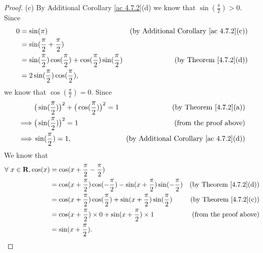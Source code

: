\begin{proof}{(c)}
    By Additional Corollary \ref{ac 4.7.2}(d) we know that \(\sin(\frac{\pi}{2}) > 0\).
    Since
    \begin{align*}
        0 & = \sin(\pi)                                                                         & \text{(by Additional Corollary \ref{ac 4.7.2}(c))} \\
          & = \sin(\frac{\pi}{2} + \frac{\pi}{2})                                                                                                    \\
          & = \sin(\frac{\pi}{2}) \cos(\frac{\pi}{2}) + \cos(\frac{\pi}{2}) \sin(\frac{\pi}{2}) & \text{(by Theorem \ref{4.7.2}(d))}                 \\
          & = 2 \sin(\frac{\pi}{2}) \cos(\frac{\pi}{2}),
    \end{align*}
    we know that \(\cos(\frac{\pi}{2}) = 0\).
    Since
    \begin{align*}
                 & \big(\sin(\frac{\pi}{2})\big)^2 + \big(\cos(\frac{\pi}{2})\big)^2 = 1 & \text{(by Theorem \ref{4.7.2}(a))}                 \\
        \implies & \big(\sin(\frac{\pi}{2})\big)^2 = 1                                   & \text{(from the proof above)}                      \\
        \implies & \sin(\frac{\pi}{2}) = 1,                                              & \text{(by Additional Corollary \ref{ac 4.7.2}(d))}
    \end{align*}
    We know that
    \begin{align*}
        \forall\ x \in \mathbf{R}, \cos(x) & = \cos(x + \frac{\pi}{2} - \frac{\pi}{2})                                                                                          \\
                                           & = \cos(x + \frac{\pi}{2}) \cos(-\frac{\pi}{2}) - \sin(x + \frac{\pi}{2}) \sin(-\frac{\pi}{2}) & \text{(by Theorem \ref{4.7.2}(d))} \\
                                           & = \cos(x + \frac{\pi}{2}) \cos(\frac{\pi}{2}) + \sin(x + \frac{\pi}{2}) \sin(\frac{\pi}{2})   & \text{(by Theorem \ref{4.7.2}(c))} \\
                                           & = \cos(x + \frac{\pi}{2}) \times 0 + \sin(x + \frac{\pi}{2}) \times 1                         & \text{(from the proof above)}      \\
                                           & = \sin(x + \frac{\pi}{2}).

\end{align*}
\end{proof}
